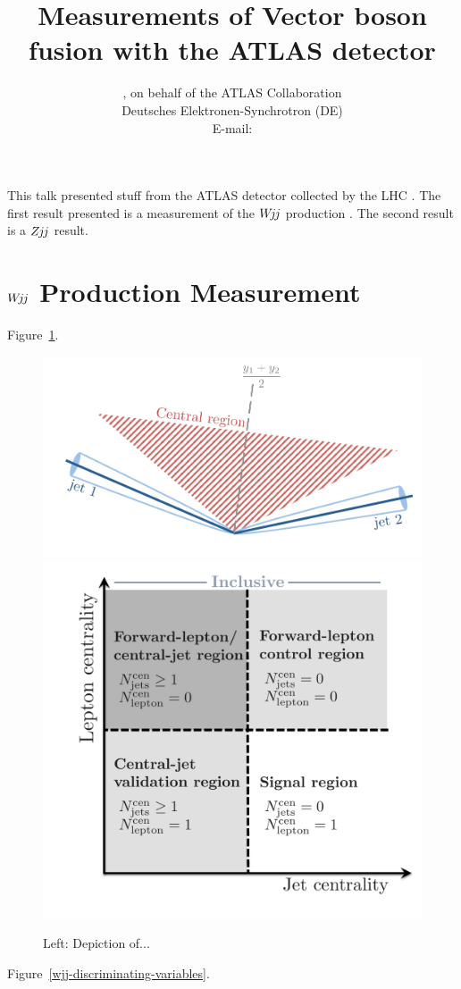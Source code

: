 \documentclass{PoS}
\title{Measurements of Vector boson fusion with the ATLAS detector}
\author{\speaker{Kurt Brendlinger},
        on behalf of the ATLAS Collaboration\\
       Deutsches Elektronen-Synchrotron (DE)\\
       E-mail: \email{kurt.brendlinger@cern.ch}}
\begin{document}
\def\wjj{\ensuremath{W\kern -0.2em j\kern -0.1emj}\xspace}
\def\zjj{\ensuremath{Z\kern -0.1em j\kern -0.1emj}\xspace}

This talk presented stuff from the ATLAS detector \cite{Aad:2008zzm} collected by the
LHC \cite{Evans:2008zzb}.
The first result presented is a measurement of the \wjj production \cite{Aaboud:2017fye}.
The second result is a \zjj result.

\section{\wjj Production Measurement}

Figure~\ref{wjj-cartoons}.

\begin{figure}
\includegraphics[width=.49\textwidth]{STDM-2014-11/fig_03.pdf}
\includegraphics[width=.49\textwidth]{STDM-2014-11/fig_04.pdf}
  \caption{Left: Depiction of...}
  \label{wjj-cartoons}
\end{figure}

Figure~\ref{wjj-discriminating-variables}.
\end{document}
